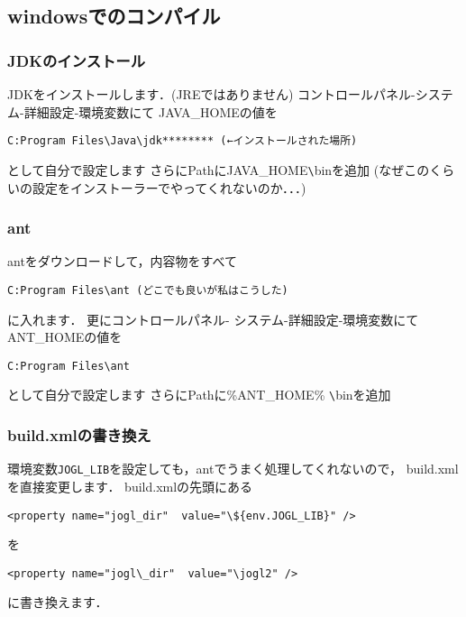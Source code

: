 \documentclass[a4j,openany]{jbook}
\begin{document}
  \subsection{windowsでのコンパイル}
   \subsubsection{JDKのインストール}
    JDKをインストールします．(JREではありません)
    コントロールパネル-システム-詳細設定-環境変数にて
    JAVA\_HOMEの値を
    \begin{screen}
\begin{verbatim}
C:Program Files\Java\jdk******** (←インストールされた場所)
\end{verbatim}
    \end{screen}
    として自分で設定します
    さらにPathにJAVA\_HOME\verb|\|binを追加
    (なぜこのくらいの設定をインストーラーでやってくれないのか．．．)
   \subsubsection{ant}
    antをダウンロードして，内容物をすべて
    \begin{screen}
\begin{verbatim}
C:Program Files\ant (どこでも良いが私はこうした)
\end{verbatim}
    \end{screen}
    に入れます．
    更にコントロールパネル- システム-詳細設定-環境変数にて
    ANT\_HOMEの値を
    \begin{screen}
\begin{verbatim}
C:Program Files\ant
\end{verbatim}
    \end{screen}
    として自分で設定します
    さらにPathに\%ANT\_HOME\% \verb|\|binを追加

   \subsubsection{build.xmlの書き換え}
    環境変数\verb|JOGL_LIB|を設定しても，antでうまく処理してくれないので，
    build.xmlを直接変更します．
    build.xmlの先頭にある
    \begin{screen}
\begin{verbatim}
<property name="jogl_dir"  value="\${env.JOGL_LIB}" />
\end{verbatim}
    \end{screen}
    を
    \begin{screen}
\begin{verbatim}
<property name="jogl\_dir"  value="\jogl2" />
\end{verbatim}
    \end{screen}
    に書き換えます．
\end{document}
